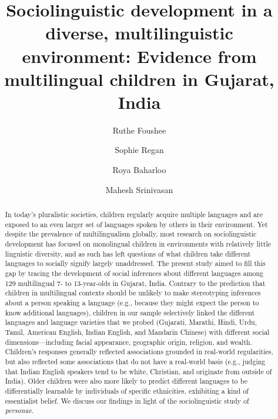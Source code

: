 \documentclass[9pt,twocolumn,twoside,lineno]{article}
\begin{document}
\title{Sociolinguistic development in a diverse, multilinguistic environment: Evidence from multilingual children in Gujarat, India}

\author[1,2, \Letter]{Ruthe Foushee}
\author[2]{Sophie Regan}
\author[2]{Roya Baharloo}
\author[2]{Mahesh Srinivasan}

\maketitle
%
\begin{abstract}
\noindent
In today's pluralistic societies, children regularly acquire multiple languages and are exposed to an even larger set of languages spoken by others in their environment. Yet despite the prevalence of multilingualism globally, most research on sociolinguistic development has focused on monolingual children in environments with relatively little linguistic diversity, and as such has left questions of what children take different languages to socially signify largely unaddressed. The present study aimed to fill this gap by tracing the development of social inferences about different languages among 129 multilingual 7- to 13-year-olds in Gujarat, India. Contrary to the prediction that children in multilingual contexts should be unlikely to make stereotyping inferences about a person speaking a language (e.g., because they might expect the person to know additional languages), children in our sample selectively linked the different languages and language varieties that we probed (Gujarati, Marathi, Hindi, Urdu, Tamil, American English, Indian English, and Mandarin Chinese) with different social dimensions---including facial appearance, geographic origin, religion, and wealth. Children's responses generally reflected associations grounded in real-world regularities, but also reflected some associations that do not have a real-world basis (e.g., judging that Indian English speakers tend to be white, Christian, and originate from outside of India). Older children were also more likely to predict different languages to be differentially learnable by individuals of specific ethnicities, exhibiting a kind of essentialist belief. We discuss our findings in light of the sociolinguistic study of \textit{personae}.
\end{abstract}
\end{document}
